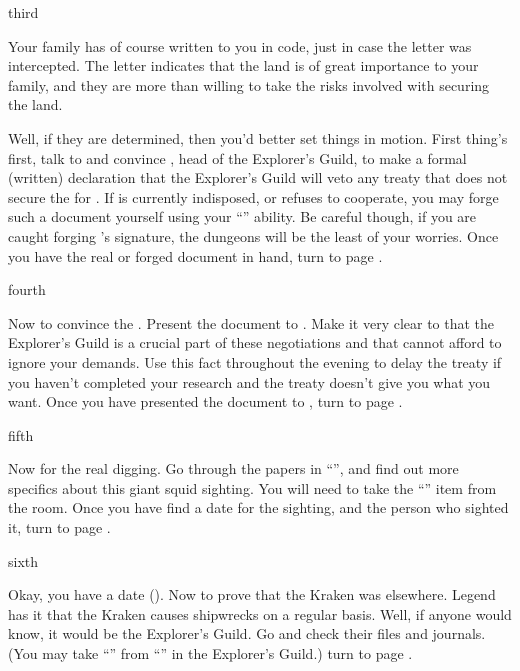 \documentclass[greennotebook]{NeptuneBall}
\begin{document}
\begin{page}{third}

Your family has of course written to you in code, just in case the letter was intercepted. The letter indicates that the land is of great importance to your family, and they are more than willing to take the risks involved with securing the land. 

Well, if they are determined, then you'd better set things in motion. First thing's first, talk to \cPlant{} and convince \cPlant{\them}, head of the Explorer's Guild, to make a formal (written) declaration that the Explorer's Guild will veto any treaty that does not secure the \pGazaStrip{} for \pAtlantis{}. If \cPlant{\they} is currently indisposed, or refuses to cooperate, you may forge such a document yourself using your ``\aForgery{}'' ability. Be careful though, if you are caught forging \cPlant{}'s signature, the dungeons will be the least of your worries.  Once you have the real or forged document in hand, turn to page .

\end{page}

\begin{page}{fourth}

Now to convince the \cKing{\King}. Present the document to \cKing{\King} \cKing{}. Make it very clear to \cKing{\them} that the Explorer's Guild is a crucial part of these negotiations and that \cKing{\they} cannot afford to ignore your demands. Use this fact throughout the evening to delay the treaty if you haven't completed your research and the treaty doesn't give you what you want. Once you have presented the document to \cKing{}, turn to page .

\end{page}

\begin{page}{fifth}

Now for the real digging. Go through the papers in ``\sPrince{}'', and find out more specifics about this giant squid sighting. You will need to take the ``\iReference{}'' item from the room. Once you have find a date for the sighting, and the person who sighted it, turn to page .

\end{page}

\begin{page}{sixth}

Okay, you have a date (\cKraken{\MYname}). Now to prove that the Kraken was elsewhere. Legend has it that the Kraken causes shipwrecks on a regular basis. Well, if anyone would know, it would be the Explorer's Guild. Go and check their files and journals. (You may take ``\iNorthSeasJournal{}'' from ``\sJournals{}'' in the Explorer's Guild.)  turn to page .

\end{page}
\end{document}
